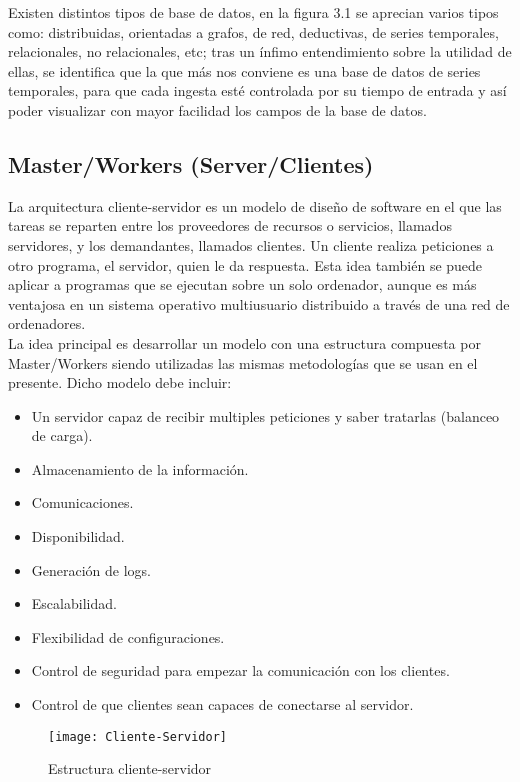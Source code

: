 \documentclass[ spanish, a4paper, 12pt, oneside]{report}
\begin{document}
Existen distintos tipos de base de datos, en la figura 3.1 se aprecian varios tipos como: distribuidas, orientadas a grafos, de red, deductivas, de series temporales, relacionales, no relacionales, etc; tras un ínfimo 
entendimiento sobre la utilidad de ellas, se identifica que la que más nos conviene es una base de datos de series temporales, para que cada ingesta esté controlada por su 
tiempo de entrada y así poder visualizar con mayor facilidad los campos de la base de datos. \\


\subsection{Master/Workers (Server/Clientes)}
La arquitectura cliente-servidor es un modelo de diseño de software en el que las tareas se reparten entre los proveedores de recursos o servicios, llamados servidores, y los demandantes, llamados clientes. Un cliente 
realiza peticiones a otro programa, el servidor, quien le da respuesta. Esta idea también se puede aplicar a programas que se ejecutan sobre un solo ordenador, aunque es más ventajosa en un sistema operativo multiusuario 
distribuido a través de una red de ordenadores.\\

La idea principal es desarrollar un modelo con una estructura compuesta por Master/Workers siendo utilizadas las mismas metodologías que se usan en el presente. Dicho modelo debe incluir: \\

\begin{itemize}
   \item Un servidor capaz de recibir multiples peticiones y saber tratarlas (balanceo de carga).
   \item Almacenamiento de la información.
   \item Comunicaciones.
   \item Disponibilidad.
   \item Generación de logs.
   \item Escalabilidad.
   \item Flexibilidad de configuraciones.
   \item Control de seguridad para empezar la comunicación con los clientes.
   \item Control de que clientes sean capaces de conectarse al servidor.
\end{itemize}

\begin{figure}[!h]
   \centering
   \texttt{[image: Cliente-Servidor]}\\
      \caption{\label{fig: Estructura cliente-servidor} Estructura cliente-servidor}
\end{figure}
\end{document}
